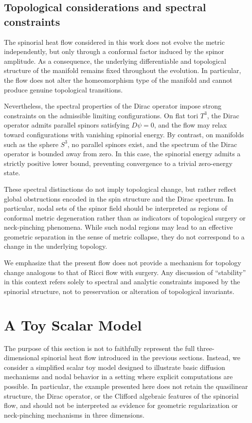 \documentclass[11pt, reqno, a4paper]{amsart}
\theoremstyle{definition}
\theoremstyle{remark}
\begin{document}
\subsection{Topological considerations and spectral constraints}

The spinorial heat flow considered in this work does not evolve the metric
independently, but only through a conformal factor induced by the spinor
amplitude.
As a consequence, the underlying differentiable and topological structure
of the manifold remains fixed throughout the evolution.
In particular, the flow does not alter the homeomorphism type of the manifold
and cannot produce genuine topological transitions.

Nevertheless, the spectral properties of the Dirac operator impose strong
constraints on the admissible limiting configurations.
On flat tori $T^3$, the Dirac operator admits parallel spinors satisfying
$D\psi = 0$, and the flow may relax toward configurations with vanishing
spinorial energy.
By contrast, on manifolds such as the sphere $S^3$, no parallel spinors exist,
and the spectrum of the Dirac operator is bounded away from zero.
In this case, the spinorial energy admits a strictly positive lower bound,
preventing convergence to a trivial zero-energy state.

These spectral distinctions do not imply topological change, but rather
reflect global obstructions encoded in the spin structure and the Dirac
spectrum.
In particular, nodal sets of the spinor field should be interpreted as regions
of conformal metric degeneration rather than as indicators of topological
surgery or neck-pinching phenomena.
While such nodal regions may lead to an effective geometric separation in the
sense of metric collapse, they do not correspond to a change in the underlying
topology.

We emphasize that the present flow does not provide a mechanism for topology
change analogous to that of Ricci flow with surgery.
Any discussion of ``stability'' in this context refers solely to spectral and
analytic constraints imposed by the spinorial structure, not to preservation
or alteration of topological invariants.


\section{A Toy Scalar Model}

The purpose of this section is not to faithfully represent the full three-dimensional spinorial heat flow introduced in the previous sections. Instead, we consider a simplified scalar toy model designed to illustrate basic diffusion mechanisms and nodal behavior in a setting where explicit computations are possible.
In particular, the example presented here does not retain the quasilinear structure, the Dirac operator, or the Clifford algebraic features of the spinorial flow, and should not be interpreted as evidence for geometric regularization or neck-pinching mechanisms in three dimensions.
\end{document}
